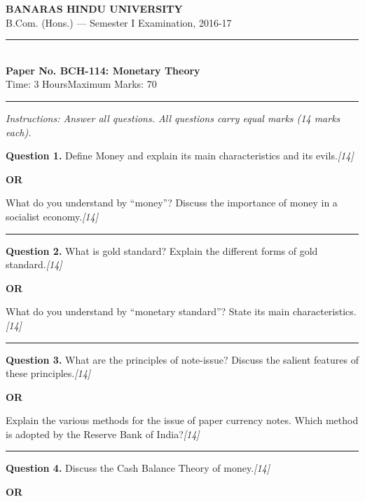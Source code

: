 \documentclass[11pt,a4paper]{article}
\newcommand{\pts}[1]{\hfill   \textit{[#1]}}
\begin{document}
\begin{center}
  {\large\bfseries BANARAS HINDU UNIVERSITY}\\[2pt]
  {\normalsize B.Com. (Hons.) --- Semester I Examination, 2016-17}\\[6pt]
  \rule{0.8\linewidth}{0.5pt}\\[6pt]
  {\large\bfseries Paper No. BCH-114: Monetary Theory}\\[4pt]
  {\normalsize Time: 3 Hours\hfill Maximum Marks: 70}
\end{center}

\rule{\linewidth}{0.4pt}

\smallskip



\noindent   \textit{Instructions: Answer all questions. All questions carry equal marks (14 marks each).}

\bigskip




\noindent   \textbf{Question 1.}
Define Money and explain its main characteristics and its evils.\pts{14}

\centerline{   \textbf{OR}}

What do you understand by ``money''? Discuss the importance of money in a socialist economy.\pts{14}

\medskip\rule{\linewidth}{0.2pt}




\noindent   \textbf{Question 2.}
What is gold standard? Explain the different forms of gold standard.\pts{14}

\centerline{   \textbf{OR}}

What do you understand by ``monetary standard''? State its main characteristics.\pts{14}

\medskip\rule{\linewidth}{0.2pt}




\noindent   \textbf{Question 3.}
What are the principles of note-issue? Discuss the salient features of these principles.\pts{14}

\centerline{   \textbf{OR}}

Explain the various methods for the issue of paper currency notes. Which method is adopted by the Reserve Bank of India?\pts{14}

\medskip\rule{\linewidth}{0.2pt}




\noindent   \textbf{Question 4.}
Discuss the Cash Balance Theory of money.\pts{14}

\centerline{   \textbf{OR}}
\end{document}
